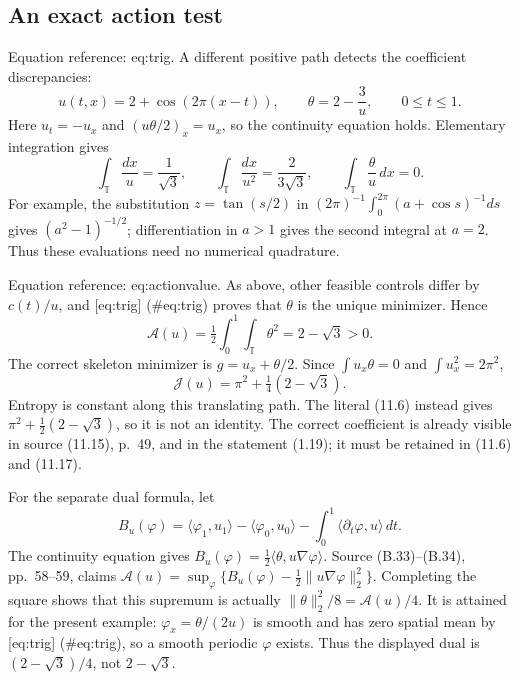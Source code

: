 \documentclass[10pt]{article}
\begin{document}
\subsection*{An exact action test}
Equation reference: eq:trig. A different positive path detects the coefficient discrepancies: \[u(t,x)=2+\cos(2\pi(x-t)),\qquad
\theta=2-\frac3u,\qquad 0\le t\le1.\] Here \(u_t=-u_x\) and \((u\theta/2)_x=u_x\), so the continuity equation holds. Elementary integration gives \[
\int_{\mathbb T}\frac{dx}{u}=\frac1{\sqrt3},\qquad
\int_{\mathbb T}\frac{dx}{u^2}=\frac2{3\sqrt3},\qquad
\int_{\mathbb T}\frac{\theta}{u}\,dx=0.\] For example, the substitution \(z=\tan(s/2)\) in \((2\pi)^{-1}\int_0^{2\pi}(a+\cos s)^{-1}ds\) gives \((a^2-1)^{-1/2}\); differentiation in \(a>1\) gives the second integral at \(a=2\). Thus these evaluations need no numerical quadrature.\par
Equation reference: eq:actionvalue. As above, other feasible controls differ by \(c(t)/u\), and [eq:trig] (\#eq:trig) proves that \(\theta\) is the unique minimizer. Hence \[
\mathcal A(u)=\tfrac12\int_0^1\int_{\mathbb T}\theta^2=2-\sqrt3>0.\] The correct skeleton minimizer is \(g=u_x+\theta/2\). Since \(\int u_x\theta=0\) and \(\int u_x^2=2\pi^2\), \[\mathcal J(u)=\pi^2+\tfrac14(2-\sqrt3).\] Entropy is constant along this translating path. The literal (11.6) instead gives \(\pi^2+\tfrac12(2-\sqrt3)\), so it is not an identity. The correct coefficient is already visible in source (11.15), p. 49, and in the statement (1.19); it must be retained in (11.6) and (11.17).\par
For the separate dual formula, let \[B_u(\varphi)=\langle\varphi_1,u_1\rangle-\langle\varphi_0,u_0\rangle
 -\int_0^1\langle\partial_t\varphi,u\rangle\,dt .\] The continuity equation gives \(B_u(\varphi)=\tfrac12\langle\theta,u\nabla\varphi\rangle\). Source (B.33)–(B.34), pp. 58–59, claims \(\mathcal A(u)=\sup_\varphi\{B_u(\varphi)-\tfrac12\|u\nabla\varphi\|_2^2\}\). Completing the square shows that this supremum is actually \(\|\theta\|_2^2/8=\mathcal A(u)/4\). It is attained for the present example: \(\varphi_x=\theta/(2u)\) is smooth and has zero spatial mean by [eq:trig] (\#eq:trig), so a smooth periodic \(\varphi\) exists. Thus the displayed dual is \((2-\sqrt3)/4\), not \(2-\sqrt3\).\par
\end{document}
